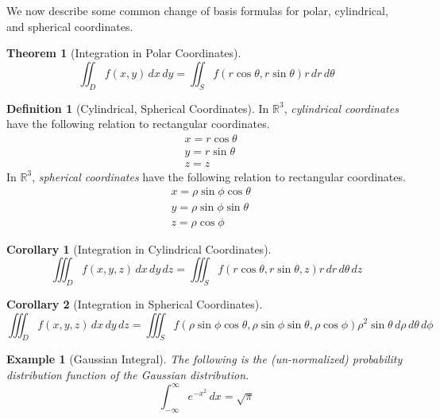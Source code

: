 \documentclass{article}
\newtheorem{theorem}{Theorem}[section]
\newtheorem{example}{Example}[section]
\newtheorem{corollary}{Corollary}[theorem]
\theoremstyle{remark}
\theoremstyle{definition}
\newtheorem{definition}{Definition}[section]
\begin{document}
We now describe some common change of basis formulas for polar, cylindrical, and spherical coordinates. 

\begin{theorem}[Integration in Polar Coordinates]
\[\iint_{D} f(x, y) \, dx \,dy = \iint_S f(r \cos{\theta}, r \sin{\theta}) r \, dr \, d\theta\]
\end{theorem}

\begin{definition}[Cylindrical, Spherical Coordinates]
In $\mathbb{R}^3$, \textit{cylindrical coordinates} have the following relation to rectangular coordinates. 
\begin{align*}
    & x = r \cos{\theta} \\
    & y = r \sin{\theta} \\
    & z = z
\end{align*}
In $\mathbb{R}^3$, \textit{spherical coordinates} have the following relation to rectangular coordinates. 
\begin{align*}
    & x = \rho \sin{\phi} \cos{\theta} \\
    & y = \rho \sin{\phi} \sin{\theta} \\
    & z = \rho \cos{\phi}
\end{align*}
\end{definition}

\begin{corollary}[Integration in Cylindrical Coordinates]
\[\iiint_D f(x, y, z) \, dx \, dy \, dz = \iiint_S f( r \cos{\theta}, r \sin{\theta}, z) r \, dr \, d\theta \, dz\]
\end{corollary}

\begin{corollary}[Integration in Spherical Coordinates]
\[\iiint_D f(x, y, z) \,dx\,dy\,dz = \iiint_S f(\rho \sin{\phi} \cos{\theta}, \rho \sin{\phi} \sin{\theta}, \rho \cos{\phi}) \rho^2 \sin{\theta} \, d\rho \, d\theta \, d\phi\]
\end{corollary}

\begin{example}[Gaussian Integral]
The following is the (un-normalized) probability distribution function of the Gaussian distribution. 
\[\int_{-\infty}^{\infty} e^{-x^2} \, dx = \sqrt{\pi}\]
\end{example}
\end{document}
